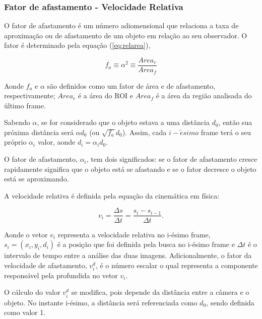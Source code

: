 \subsubsection{Fator de afastamento - Velocidade Relativa}

O fator de afastamento é um número adiomensional que relaciona a taxa de 
aproximação ou de afastamento de um objeto em relação ao seu observador.
O fator é determinado pela equação (\ref{eq:relarea}),

\begin{equation}\label{eq:relarea}
f_a \equiv \alpha^2 \equiv \frac{Area_r}{Area_f} 
\end{equation}

Aonde $f_a$ e $\alpha$ são definidos como um fator de área e de afastamento,
respectivamente; $Area_r$ é a área do ROI e $Area_f$ é a área da região analisada
do último frame.

Sabendo $\alpha$, se for considerado que o objeto estava a uma distância $d_0$, então
sua próxima distância será $\alpha d_0$ (ou $\sqrt{f_a} d_0$). Assim, cada $i-\tilde{e}simo$ frame
terá o seu próprio $\alpha_i$ valor, aonde $d_i=\alpha_i d_0$.

O fator de afastamento, $\alpha_i$, tem dois significados: se o fator de afastamento cresce rapidamente 
significa que o objeto está se afastando e se o fator decresce o objeto está se aproximando.

A velocidade relativa é definida pela equação da cinemática em física:

\begin{equation}
 v_i = \frac{\Delta s}{\Delta t}= \frac{s_i-s_{i-1}}{\Delta t}.
\end{equation}

Aonde o vetor $v_i$ representa a velocidade relativa no i-ésimo frame, $s_i=(x_i,y_i,d_i)$ é a posição que
foi definida pela busca no i-ésimo frame e $\Delta t$ é o intervalo de tempo entre a análise das duas imagens.
Adicionalmente, o fator da velocidade de afastamento, $v^d_i$, é o número escalar o qual representa a componente
responsável pela profundida no vetor $v_i$.

O cálculo do valor $v^d_i$ se modifica, pois depende da distância entre a câmera e o objeto. No instante i-ésimo,
a distância será referenciada como $d_0$, sendo definida como valor 1.
